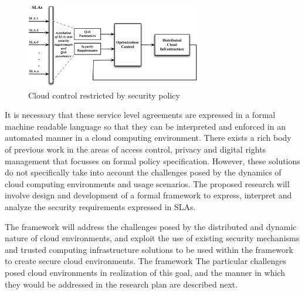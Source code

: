 \documentclass[10pt, conference, compsocconf]{IEEEtran}
\begin{document}
\begin{figure}[!t]
\centering
\includegraphics[width=3in]{cloud-security.pdf}
\caption{Cloud control restricted by security policy}
\label{fig:cloud-security}
\end{figure}

It is necessary that these service level agreements are expressed in a formal machine readable language so that they can be interpreted and enforced in an automated manner in a cloud computing environment. There exists a rich body of previous work in the areas of access control, privacy and digital rights management that focusses on formal policy specification. However,  these solutions do not specifically take into account the challenges posed by the dynamics of cloud computing environments and usage scenarios. The proposed research will involve design and development of a formal framework to express, interpret and analyze the security requirements expressed in SLAs. 

The framework will address the challenges posed by the distributed and dynamic nature of cloud environments, and exploit the use of existing security mechanisms and trusted computing infrastructure solutions to be used within the framework to create secure cloud environments. The framework The particular challenges posed cloud environments in realization of this goal, and the manner in which they would be addressed in the research plan are described next.
\end{document}
